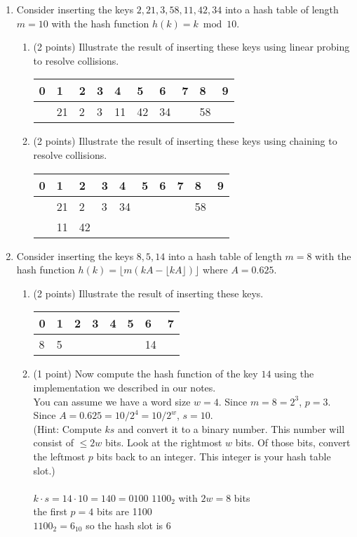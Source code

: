 \documentclass[12pt]{elsart}
\begin{document}
\begin{enumerate}
   \item Consider inserting the keys $2, 21, 3, 58, 11, 42, 34$ into a hash
table of length $m = 10$ with the hash function $h(k) = k \bmod 10$.
\begin{enumerate}
   \item (2 points)  Illustrate the result of inserting these keys using linear probing to resolve collisions.\\
   \begin{tabular}{|l|l|l|l|l|l|l|l|l|l|}
     \hline
     0 & 1 & 2 & 3 & 4 & 5 & 6 & 7 & 8 & 9\\
     \hline
      & 21 & 2 & 3 & 11 & 42 & 34 & & 58 &\\
     \hline
   \end{tabular}
   \item (2 points) Illustrate the result of inserting these keys using chaining to resolve collisions.\\
   \begin{tabular}{|l|l|l|l|l|l|l|l|l|l|}
     \hline
     0 & 1 & 2 & 3 & 4 & 5 & 6 & 7 & 8 & 9\\
     \hline
      & 21 & 2 & 3 & 34 & & & & 58 &\\

      & 11 & 42 & & & & & & &\\
     \hline
   \end{tabular}
\end{enumerate}

   \item Consider inserting the keys $8,5,14$ into a hash
table of length $m = 8$ with the hash function $h(k) = \lfloor m(kA - \lfloor kA\rfloor)\rfloor$ where $A=0.625$.
\begin{enumerate}
   \item (2 points) Illustrate the result of inserting these keys.\\
   \begin{tabular}{|l|l|l|l|l|l|l|l|}
     \hline
     0 & 1 & 2 & 3 & 4 & 5 & 6 & 7\\
     \hline
     8 & 5 & & & & & 14 & \\
     \hline
   \end{tabular}
\newpage
   \item (1 point) Now compute the hash function of the key $14$ using the implementation we described in our notes. 
\\You can assume we have a word size $w=4$. Since $m=8=2^3$, $p=3$.  Since $A=0.625=10/2^4=10/2^w$, $s=10$.
\\(Hint: Compute $ks$ and convert it to a binary number.  This number will consist of $\leq 2w$ bits.  Look at the rightmost $w$ bits.  Of those bits, convert the leftmost $p$ bits back to an integer.  This integer is your hash table slot.)\\\\
   $k \cdot s = 14 \cdot 10 = 140 = 0100$ $1100_2$ with $2w = 8$ bits\\
   the first $p = 4$ bits are 1100\\
   $1100_2 = 6_{10}$ so the hash slot is 6
\end{enumerate}
\end{enumerate}
\end{document}
